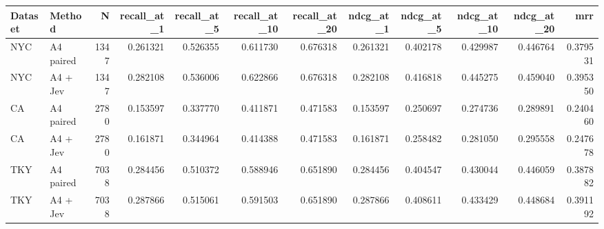 \begin{tabular}{llrrrrrrrrrr}
\hline
Dataset & Method & N & recall\_at\_1 & recall\_at\_5 & recall\_at\_10 & recall\_at\_20 & ndcg\_at\_1 & ndcg\_at\_5 & ndcg\_at\_10 & ndcg\_at\_20 & mrr \\
\hline
NYC & A4 paired & 1347 & 0.261321 & 0.526355 & 0.611730 & 0.676318 & 0.261321 & 0.402178 & 0.429987 & 0.446764 & 0.379531 \\
NYC & A4 + Jev & 1347 & 0.282108 & 0.536006 & 0.622866 & 0.676318 & 0.282108 & 0.416818 & 0.445275 & 0.459040 & 0.395350 \\
CA & A4 paired & 2780 & 0.153597 & 0.337770 & 0.411871 & 0.471583 & 0.153597 & 0.250697 & 0.274736 & 0.289891 & 0.240460 \\
CA & A4 + Jev & 2780 & 0.161871 & 0.344964 & 0.414388 & 0.471583 & 0.161871 & 0.258482 & 0.281050 & 0.295558 & 0.247678 \\
TKY & A4 paired & 7038 & 0.284456 & 0.510372 & 0.588946 & 0.651890 & 0.284456 & 0.404547 & 0.430044 & 0.446059 & 0.387882 \\
TKY & A4 + Jev & 7038 & 0.287866 & 0.515061 & 0.591503 & 0.651890 & 0.287866 & 0.408611 & 0.433429 & 0.448684 & 0.391192 \\
\hline
\end{tabular}
